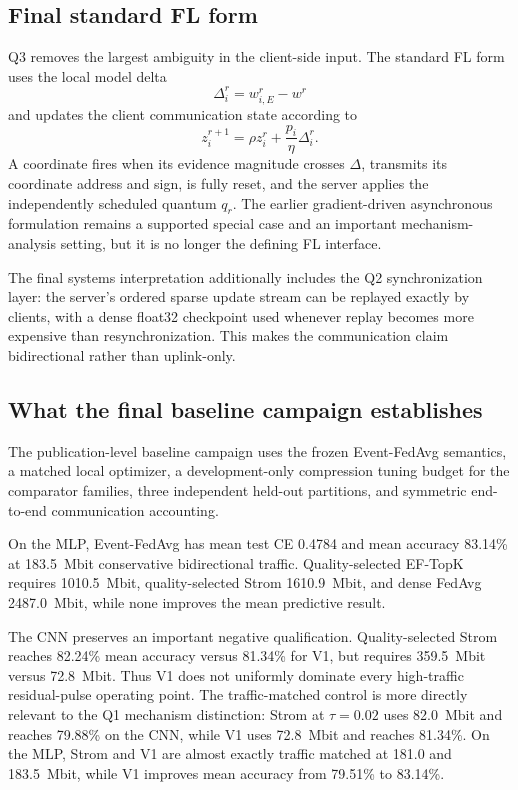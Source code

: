 \subsection{Final standard FL form}

Q3 removes the largest ambiguity in the client-side input. The standard FL form uses the local model delta
\begin{equation}
    \Delta_i^r=w_{i,E}^r-w^r
\end{equation}
and updates the client communication state according to
\begin{equation}
    z_i^{r+1}
    =\rho z_i^r
    +\frac{p_i}{\eta}\Delta_i^r.
\end{equation}
A coordinate fires when its evidence magnitude crosses $\Delta$, transmits its coordinate address and sign, is fully reset, and the server applies the independently scheduled quantum $q_r$. The earlier gradient-driven asynchronous formulation remains a supported special case and an important mechanism-analysis setting, but it is no longer the defining FL interface.

The final systems interpretation additionally includes the Q2 synchronization layer: the server's ordered sparse update stream can be replayed exactly by clients, with a dense float32 checkpoint used whenever replay becomes more expensive than resynchronization. This makes the communication claim bidirectional rather than uplink-only.

\subsection{What the final baseline campaign establishes}

The publication-level baseline campaign uses the frozen Event-FedAvg semantics, a matched local optimizer, a development-only compression tuning budget for the comparator families, three independent held-out partitions, and symmetric end-to-end communication accounting.

On the MLP, Event-FedAvg has mean test CE 0.4784 and mean accuracy 83.14\% at 183.5~Mbit conservative bidirectional traffic. Quality-selected EF-TopK requires 1010.5~Mbit, quality-selected Strom 1610.9~Mbit, and dense FedAvg 2487.0~Mbit, while none improves the mean predictive result.

The CNN preserves an important negative qualification. Quality-selected Strom reaches 82.24\% mean accuracy versus 81.34\% for V1, but requires 359.5~Mbit versus 72.8~Mbit. Thus V1 does not uniformly dominate every high-traffic residual-pulse operating point. The traffic-matched control is more directly relevant to the Q1 mechanism distinction: Strom at $\tau=0.02$ uses 82.0~Mbit and reaches 79.88\% on the CNN, while V1 uses 72.8~Mbit and reaches 81.34\%. On the MLP, Strom and V1 are almost exactly traffic matched at 181.0 and 183.5~Mbit, while V1 improves mean accuracy from 79.51\% to 83.14\%.

